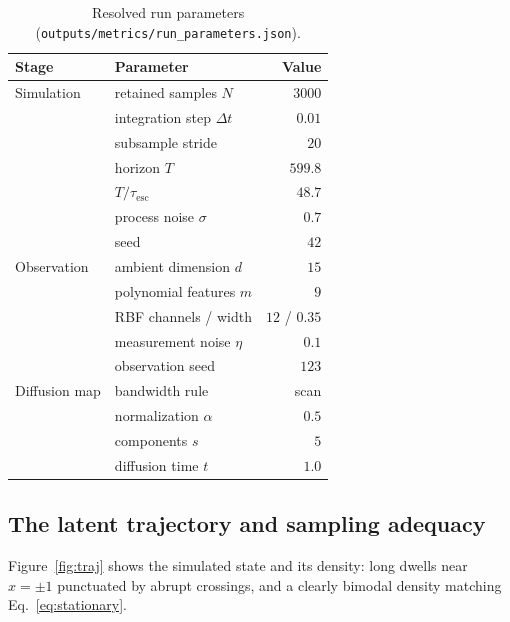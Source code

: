 \documentclass[11pt]{article}
\begin{document}
\begin{table}[t]
\centering
\caption{Resolved run parameters
(\texttt{outputs/metrics/run\_parameters.json}).}
\label{tab:params}
\small
\begin{tabular}{@{}llr@{}}
\toprule
Stage & Parameter & Value \\
\midrule
Simulation   & retained samples $N$          & $3000$ \\
             & integration step $\Delta t$   & $0.01$ \\
             & subsample stride              & $20$ \\
             & horizon $T$                   & $599.8$ \\
             & $T/\tau_{\mathrm{esc}}$       & $48.7$ \\
             & process noise $\sigma$        & $0.7$ \\
             & seed                          & $42$ \\
\midrule
Observation  & ambient dimension $d$         & $15$ \\
             & polynomial features $m$       & $9$ \\
             & RBF channels / width          & $12$ / $0.35$ \\
             & measurement noise $\eta$      & $0.1$ \\
             & observation seed              & $123$ \\
\midrule
Diffusion map& bandwidth rule                & scan \\
             & normalization $\alpha$        & $0.5$ \\
             & components $s$                & $5$ \\
             & diffusion time $t$            & $1.0$ \\
\bottomrule
\end{tabular}
\end{table}

\subsection{The latent trajectory and sampling adequacy}
\label{sec:res-trajectory}

Figure~\ref{fig:traj} shows the simulated state and its density: long dwells near
$x=\pm1$ punctuated by abrupt crossings, and a clearly bimodal density matching
Eq.~\eqref{eq:stationary}.
\end{document}
